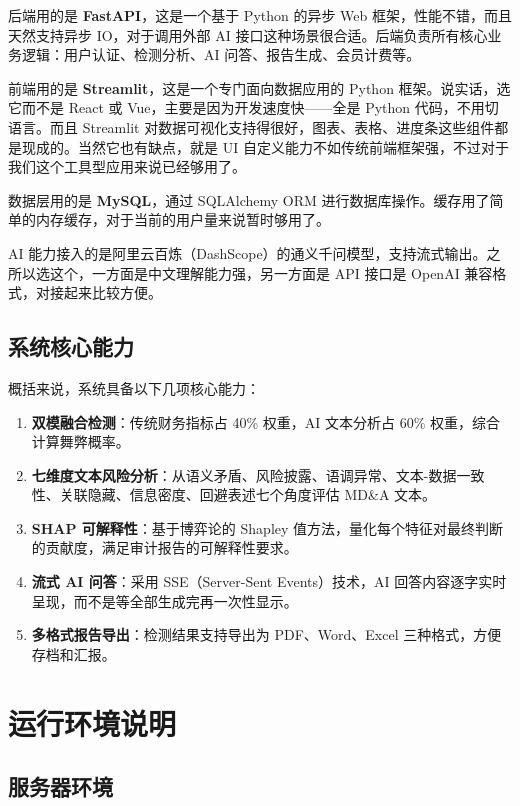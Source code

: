 \documentclass[12pt,a4paper]{ctexart}
\begin{document}
后端用的是 \textbf{FastAPI}，这是一个基于 Python 的异步 Web 框架，性能不错，而且天然支持异步 IO，对于调用外部 AI 接口这种场景很合适。后端负责所有核心业务逻辑：用户认证、检测分析、AI 问答、报告生成、会员计费等。

前端用的是 \textbf{Streamlit}，这是一个专门面向数据应用的 Python 框架。说实话，选它而不是 React 或 Vue，主要是因为开发速度快——全是 Python 代码，不用切语言。而且 Streamlit 对数据可视化支持得很好，图表、表格、进度条这些组件都是现成的。当然它也有缺点，就是 UI 自定义能力不如传统前端框架强，不过对于我们这个工具型应用来说已经够用了。

数据层用的是 \textbf{MySQL}，通过 SQLAlchemy ORM 进行数据库操作。缓存用了简单的内存缓存，对于当前的用户量来说暂时够用了。

AI 能力接入的是阿里云百炼（DashScope）的通义千问模型，支持流式输出。之所以选这个，一方面是中文理解能力强，另一方面是 API 接口是 OpenAI 兼容格式，对接起来比较方便。

\subsection{系统核心能力}

概括来说，系统具备以下几项核心能力：

\begin{enumerate}
    \item \textbf{双模融合检测}：传统财务指标占 40\% 权重，AI 文本分析占 60\% 权重，综合计算舞弊概率。
    \item \textbf{七维度文本风险分析}：从语义矛盾、风险披露、语调异常、文本-数据一致性、关联隐藏、信息密度、回避表述七个角度评估 MD\&A 文本。
    \item \textbf{SHAP 可解释性}：基于博弈论的 Shapley 值方法，量化每个特征对最终判断的贡献度，满足审计报告的可解释性要求。
    \item \textbf{流式 AI 问答}：采用 SSE（Server-Sent Events）技术，AI 回答内容逐字实时呈现，而不是等全部生成完再一次性显示。
    \item \textbf{多格式报告导出}：检测结果支持导出为 PDF、Word、Excel 三种格式，方便存档和汇报。
\end{enumerate}

\newpage

\section{运行环境说明}

\subsection{服务器环境}
\end{document}
